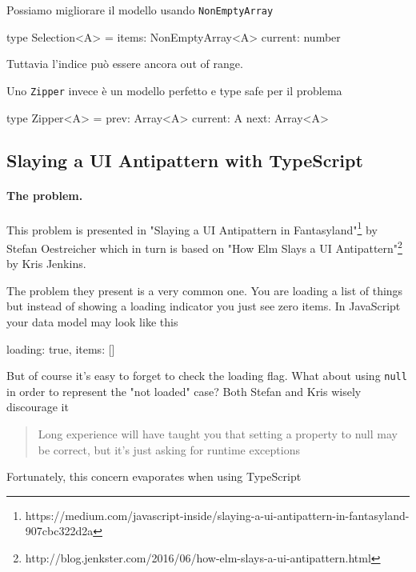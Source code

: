 \documentclass[12pt]{article}
\theoremstyle{definition}
\newenvironment{code}
  {\vspace{0.5cm} \VerbatimEnvironment\begin{typescriptcode}}
  {\end{typescriptcode} \vspace{0.2cm}}
\begin{document}
Possiamo migliorare il modello usando \texttt{NonEmptyArray}

\begin{code}
type Selection<A> = {
  items: NonEmptyArray<A>
  current: number
}
\end{code}

Tuttavia l'indice può essere ancora out of range.

Uno \texttt{Zipper} invece è un modello perfetto e type safe per il problema

\begin{code}
type Zipper<A> = {
  prev: Array<A>
  current: A
  next: Array<A>
}
\end{code}

\newpage
\subsection{Slaying a UI Antipattern with TypeScript}

\paragraph{The problem.}

This problem is presented in "Slaying a UI Antipattern in Fantasyland"\footnote{https://medium.com/javascript-inside/slaying-a-ui-antipattern-in-fantasyland-907cbc322d2a}
by Stefan Oestreicher which in turn is based on "How Elm Slays a UI Antipattern"\footnote{http://blog.jenkster.com/2016/06/how-elm-slays-a-ui-antipattern.html}
by Kris Jenkins.

The problem they present is a very common one. You are loading a list of things but instead of showing a loading indicator
you just see zero items. In JavaScript your data model may look like this

\begin{code}
{ loading: true, items: [] }
\end{code}

But of course it's easy to forget to check the loading flag. What about using \texttt{null} in order to represent the "not loaded" case?
Both Stefan and Kris wisely discourage it

\begin{quote}
Long experience will have taught you that setting a property to null may be correct, but it's just asking for runtime exceptions
\end{quote}

Fortunately, this concern evaporates when using TypeScript
\end{document}
